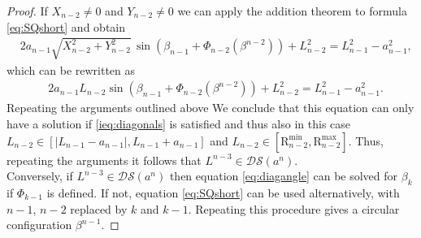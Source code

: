 \documentclass[10pt,a4paper]{amsart}
\begin{document}
\begin{proof}
If $X_{n-2} \neq 0 $ and  $Y_{n-2} \neq 0 $ we can apply the addition theorem to formula \eqref{eq:SQshort} and obtain   
\begin{align*}
& 2 a_{n-1} \sqrt{  X_{n-2}^2 + Y_{n-2}^2 } \, \sin\left( \beta_{n-1} + \Phi_{n-2}\left(\beta^{n-2} \right)  \right) + L_{n-2}^2  = L_{n-1}^2 - a_{n-1}^2,   
\end{align*}
which can be rewritten as 
\begin{align*}
& 2 a_{n-1} L_{n-2} \sin\left( \beta_{n-1} + \Phi_{n-2}\left(\beta^{n-2} \right)  \right) + L_{n-2}^2  = L_{n-1}^2 - a_{n-1}^2.   
\end{align*}
Repeating the arguments outlined above We conclude  that this equation can only have a solution if \eqref{ieq:diagonals} is satisfied and thus also in this case $L_{n-2}  \in  [ |L_{n-1} -a_{n-1}|,  L_{n-1} +a_{n-1} ]$ and $L_{n-2} \in [\mathrm{R}_{n-2}^{\min}, \mathrm{    R}_{n-2}^{\max}]$. Thus, repeating the arguments it follows that $L^{n-3} \in \mathcal{DS}(a^n)$.\\
       
Conversely, if $L^{n-3} \in \mathcal{DS}(a^n)$ then  equation \eqref{eq:diagangle} can be solved for $\beta_k$ if $\Phi_{k-1}$ is defined. If not, equation \eqref{eq:SQshort} can be used alternatively, with $n-1$, $n-2$ replaced by $k$ and $k-1$. Repeating this procedure gives a circular configuration $\beta^{n-1}$. 
\end{proof}
\end{document}
